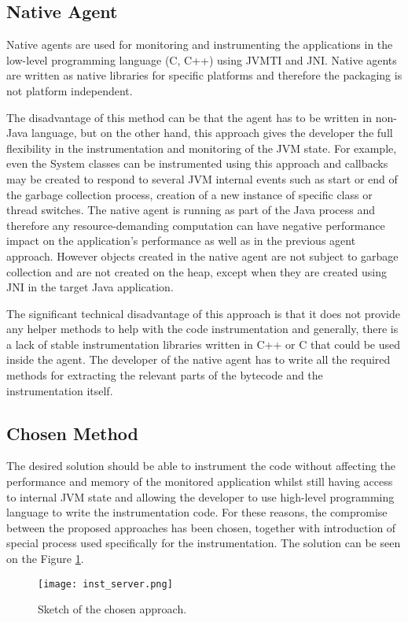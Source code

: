 \subsection{Native Agent}
Native agents are used for monitoring and instrumenting the applications in the low-level programming language (C, C++) using JVMTI and JNI. Native agents are written as native libraries for specific platforms and therefore the packaging is not platform independent. 

The disadvantage of this method can be that the agent has to be written in non-Java language, but on the other hand, this approach gives the developer the full flexibility in the instrumentation and monitoring of the JVM state. For example, even the System classes can be instrumented using this approach and callbacks may be created to respond to several JVM internal events such as start or end of the garbage collection process, creation of a new instance of specific class or thread switches. The native agent is running as part of the Java process and therefore any resource-demanding computation can have negative performance impact on the application's performance as well as in the previous agent approach. However objects created in the native agent are not subject to garbage collection and are not created on the heap, except when they are created using JNI in the target Java application.

The significant technical disadvantage of this approach is that it does not provide any helper methods to help with the code instrumentation and generally, there is a lack of stable instrumentation libraries written in C++ or C that could be used inside the agent. The developer of the native agent has to write all the required methods for extracting the relevant parts of the bytecode and the instrumentation itself.
\subsection{Chosen Method}
\label{subsec:inst_jvm}
The desired solution should be able to instrument the code without affecting the performance and memory of the monitored application whilst still having access to internal JVM state and allowing the developer to use high-level programming language to write the instrumentation code. For these reasons, the compromise between the proposed approaches has been chosen, together with introduction of special process used specifically for the instrumentation. The solution can be seen on the Figure \ref{fig:inst_server_basic}.
\begin{figure}
	\centering
	\texttt{[image: inst\_server.png]}
	\caption{Sketch of the chosen approach.}
	\label{fig:inst_server_basic}
\end{figure}

